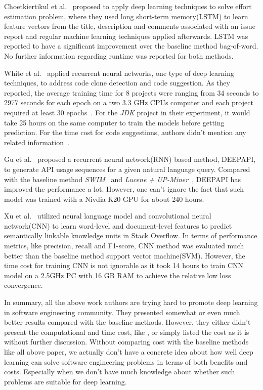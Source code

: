  Choetkiertikul et al.~\cite{choetkiertikul2016deep} proposed to apply deep learning techniques
 to solve effort estimation problem, where they used long short-term memory(LSTM) to learn
 feature vectors from the title, description and comments associated with an issue report and
 regular machine learning techniques applied afterwards. LSTM was reported to have a 
 significant improvement over the baseline method bag-of-word. No further information regarding
 runtime was reported for both methods.
 
 White et al.~\cite{white2015toward, white2016deep} applied
 recurrent neural networks, one type of  deep learning techniques, 
 to address code clone detection and code suggestion. As they reported,
 the average training time for 8 projects were ranging from 34 seconds
  to 2977 seconds for each epoch on a two 3.3 GHz
 CPUs computer and each project required at least 30 epochs~\cite{white2016deep}.
 For the {\it JDK} project in their experiment, it would take 25 hours 
 on the same computer to train the models before getting prediction.
 For the time cost for code suggestions, authors didn't mention any related information~\cite{white2015toward}.

Gu et al.~\cite{gu2016deep} proposed  a recurrent neural network(RNN)
 based method, D{\scriptsize EEP}API, to generate API usage sequences for a given natural language query. 
 Compared with the baseline method {\it SWIM}~\cite{raghothaman2016swim} and 
 {\it Lucene + UP-Miner}~\cite{wang2013mining},  D{\scriptsize EEP}API has improved the performance a lot.
 However, one can't ignore the fact that such model was trained with a Nivdia K20 GPU for about 240 hours.
 
 Xu et al.~\cite{xu2016predicting} utilized neural language model and  
 convolutional neural network(CNN) to  learn word-level and document-level features to
 predict semantically linkable knowledge units in Stack Overflow. 
 In terms of performance metrics, like precision, recall and F1-score,
 CNN method was evaluated much better than 
 the baseline method support vector machine(SVM). 
 However, the time cost for training CNN is not ignorable as it took
 14 hours to train CNN model on a 2.5GHz PC with 16 GB RAM 
 to achieve the relative low loss convergence.
 
 In summary, all the above work authors are trying hard to promote deep learning in software
 engineering community. They presented somewhat or even much better results compared with
 the baseline methods. However, they either didn't present the computational and time cost, like \cite{white2016deep,white2015toward,lam2015combining,choetkiertikul2016deep}, or simply listed
 the cost as it is without further discussion\cite{wang2016automatically, gu2016deep, xu2016predicting}. Without comparing cost with the baseline methods like all above paper,
 we actually don't have a concrete idea about how well deep learning can solve software engineering problems in terms of both benefits and costs. Especially when we don't have much knowledge about
 whether such problems are suitable for deep learning. 
 
